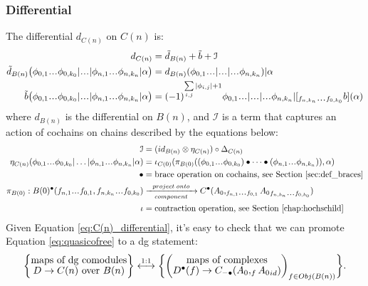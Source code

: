 \subsubsection{Differential}
The differential $d_{C(n)}$ on $C(n)$ is: 
%
\begin{equation} 
\label{eq:C(n)_differential}
\begin{split}
d_{C(n)} &= 
\tilde{d}_{B(n)} + \tilde{b} + \mathcal{I}\\
%
\tilde{d}_{B(n)} \big(
\phi_{0,1}\smdots\phi_{0,k_0} | \smdots |
\phi_{n,1}\smdots\phi_{n,k_n} | \alpha \big) 
&=
d_{B(n)}( \phi_{0,1}\smdots | 
\smdots | \smdots\phi_{n,k_n} ) | \alpha\\
%
\tilde{b} \big(
\phi_{0,1}\smdots\phi_{0,k_0} | \smdots |
\phi_{n,1}\smdots\phi_{n,k_n} | \alpha \big) 
&=
(-1)^{\sum \limits_{i,j}|\phi_{i,j}|+1}
\phi_{0,1}\smdots | \smdots | \smdots 
\phi_{n,k_n} | [_{f_{n,k_n}\smdots f_{0,k_0}}
b](\alpha)
\end{split}
\end{equation}
%
where $d_{B(n)}$ is the differential on $B(n)$, 
and $\mathcal{I}$ is a term that captures an action of cochains on chains described by the equations below:
%
\begin{equation}\label{eq:action_term}
\begin{split}
\mathcal{I} 
&= 
(id_{B(n)} \otimes \eta_{C(n)})
  \circ \Delta_{C(n)}\\
\eta_{C(n)}(
\phi_{0,1}\smdots\phi_{0,k_0} | \dots |
\phi_{n,1}\smdots\phi_{n,k_n} | \alpha)
&= 
\iota_{C(0)}( \pi_{B(0)}( 
(\phi_{0,1}\smdots \phi_{0,k_0}) \bullet \dots \bullet
(\phi_{n,1}\smdots \phi_{n,k_n})), \alpha)\\
\bullet
&= 
\textrm{brace operation on cochains, 
  see Section \ref{sec:def_braces}}\\
\pi_{B(0)}: 
B(0)^\bullet
(f_{n,1}\smdots f_{0,1}, 
f_{n,k_n}\smdots f_{0,k_0})
&\xrightarrow[component]{project\;onto}
C^\bullet(A_0, _{f_{n,1}\smdots f_{0,1}}{A_0}_{f_{n,k_n}\smdots f_{0,k_0}})\\
\iota
&=
\textrm{contraction operation, 
see Section \ref{chap:hochschild}}
\end{split}
\end{equation}
%
Given Equation \ref{eq:C(n)_differential}, 
it's easy to check that we can promote 
Equation \ref{eq:quasicofree} to a dg statement:
%
\begin{equation*}
\bigg\{ \let\scriptstyle\textstyle
\substack{\textrm{maps of dg comodules}\\
  D \to C(n)\textrm{ over }B(n)} 
\bigg\}
\overset{1:1}{\longleftrightarrow}
\bigg\{ \bigg( \let\scriptstyle\textstyle
\substack{\textrm{maps of complexes}\\
  D^\bullet(f) \to C_{-\bullet}(A_0, _f{A_0}_{id})}
\bigg)_{f \in Obj(B(n))} \bigg\}.
\end{equation*}